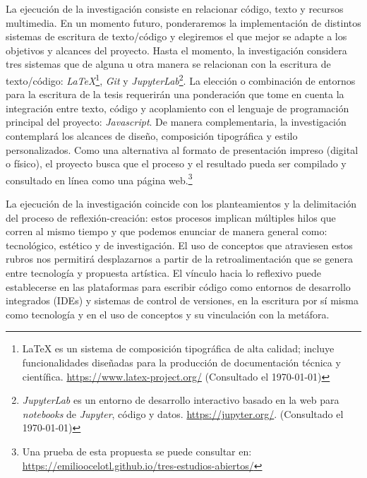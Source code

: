La ejecución de la investigación consiste en relacionar código, texto y recursos multimedia. En un momento futuro, ponderaremos la implementación de distintos sistemas de escritura de texto/código y elegiremos el que mejor se adapte a los objetivos y alcances del proyecto. Hasta el momento, la investigación considera tres sistemas que de alguna u otra manera se relacionan con la escritura de texto/código: \textit{LaTeX}\footnote{LaTeX es un sistema de composición tipográfica de alta calidad; incluye funcionalidades diseñadas para la producción de documentación técnica y científica. \url{https://www.latex-project.org/} (Consultado el \today)}, \textit{Git} y \textit{JupyterLab}\footnote{\textit{JupyterLab} es un entorno de desarrollo interactivo basado en la web para \textit{notebooks} de \textit{Jupyter}, código y datos. \url{https://jupyter.org/}. (Consultado el \today)}. La elección o combinación de entornos para la escritura de la tesis requerirán una ponderación que tome en cuenta la integración entre texto, código y acoplamiento con el lenguaje de programación principal del proyecto: \textit{Javascript}. De manera complementaria, la investigación contemplará los alcances de diseño, composición tipográfica y estilo personalizados. Como una alternativa al formato de presentación impreso (digital o físico), el proyecto busca que el proceso y el resultado pueda ser compilado y consultado en línea como una página web.\footnote{Una prueba de esta propuesta se puede consultar en: \url{https://emilioocelotl.github.io/tres-estudios-abiertos/}}

La ejecución de la investigación coincide con los planteamientos y la delimitación del proceso de reflexión-creación: estos procesos implican múltiples hilos que corren al mismo tiempo y que podemos enunciar de manera general como: tecnológico, estético y de investigación. El uso de conceptos que atraviesen estos rubros nos permitirá desplazarnos a partir de la retroalimentación que se genera entre tecnología y propuesta artística. El vínculo hacia lo reflexivo puede establecerse en las plataformas para escribir código como entornos de desarrollo integrados (IDEs) y sistemas de control de versiones, en la escritura por sí misma como tecnología y en el uso de conceptos y su vinculación con la metáfora. 


